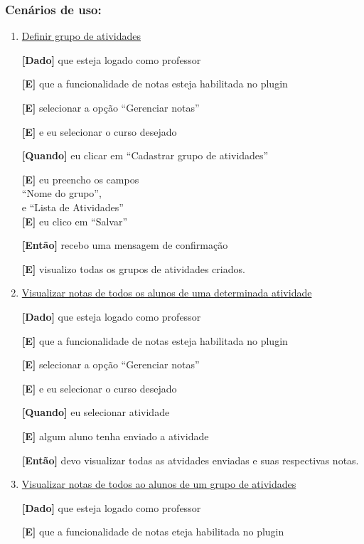 \begin{description}
\subsubsection*{Cenários de uso:}

\begin{enumerate}

\item \underline{Definir grupo de atividades}

\textbf{[Dado]} que esteja logado como professor

\textbf{[E]} que a funcionalidade de notas esteja habilitada no plugin

\textbf{[E]} selecionar a opção ``Gerenciar notas''

\textbf{[E]} e eu selecionar o curso desejado

\textbf{[Quando]} eu clicar em ``Cadastrar grupo de atividades''

\textbf{[E]} eu preencho os campos \\
``Nome do grupo'',\\
e ``Lista de Atividades''\\
\textbf{[E]} eu clico em ``Salvar''

\textbf{[Então]} recebo uma mensagem de confirmação

\textbf{[E]} visualizo todas os grupos de atividades criados.

\item \underline{Visualizar notas de todos os alunos de uma determinada atividade}

\textbf{[Dado]} que esteja logado como professor

\textbf{[E]} que a funcionalidade de notas esteja habilitada no plugin

\textbf{[E]} selecionar a opção ``Gerenciar notas''

\textbf{[E]} e eu selecionar o curso desejado

\textbf{[Quando]} eu selecionar atividade

\textbf{[E]} algum aluno tenha enviado a atividade

\textbf{[Então]} devo visualizar todas as atvidades enviadas e suas respectivas notas.

\item \underline{Visualizar notas de todos ao alunos de um grupo de atividades}

\textbf{[Dado]} que esteja logado como professor

\textbf{[E]} que a funcionalidade de notas eteja habilitada no plugin


\end{enumerate}
\end{description}
